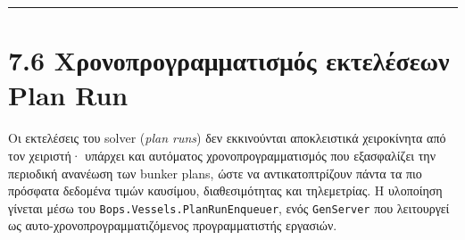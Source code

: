 \begin{center}\rule{0.5\linewidth}{0.5pt}\end{center}

\section{7.6 Χρονοπρογραμματισμός εκτελέσεων Plan
Run}\label{ux3c7ux3c1ux3bfux3bdux3bfux3c0ux3c1ux3bfux3b3ux3c1ux3b1ux3bcux3bcux3b1ux3c4ux3b9ux3c3ux3bcux3ccux3c2-ux3b5ux3baux3c4ux3b5ux3bbux3adux3c3ux3b5ux3c9ux3bd-plan-run}

Οι εκτελέσεις του solver (\emph{plan runs}) δεν εκκινούνται αποκλειστικά
χειροκίνητα από τον χειριστή· υπάρχει και αυτόματος χρονοπρογραμματισμός
που εξασφαλίζει την περιοδική ανανέωση των bunker plans, ώστε να
αντικατοπτρίζουν πάντα τα πιο πρόσφατα δεδομένα τιμών καυσίμου,
διαθεσιμότητας και τηλεμετρίας. Η υλοποίηση γίνεται μέσω του
\texttt{Bops.Vessels.PlanRunEnqueuer}, ενός \texttt{GenServer} που
λειτουργεί ως αυτο-χρονοπρογραμματιζόμενος προγραμματιστής εργασιών.

